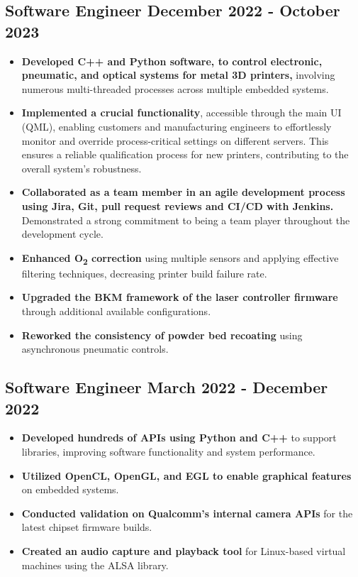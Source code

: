 \documentclass[]{article}
\begin{document}
\subsection{{\large{Software Engineer} \hfill{\small{December 2022 - October 2023}}}}
\vspace{1.5ex}

\begin{itemize}
    \item \textbf{Developed C++ and Python software, to control electronic, pneumatic, and optical systems for metal 3D printers,} involving numerous multi-threaded processes across multiple embedded systems.
    \item \textbf{Implemented a crucial functionality}, accessible through the main UI (QML), enabling customers and manufacturing engineers to effortlessly monitor and override process-critical settings on different servers. 
    This ensures a reliable qualification process for new printers, contributing to the overall system's robustness.
    \item \textbf{Collaborated as a team member in an agile development process using Jira, Git, pull request reviews and CI/CD with Jenkins.} \\ Demonstrated a strong commitment to being a team player throughout the development cycle.
    \item \textbf{Enhanced O\textsubscript{2} correction} using multiple sensors and applying effective filtering techniques, decreasing printer build failure rate.
    \item \textbf{Upgraded the BKM framework of the laser controller firmware} through additional available configurations.
    \item \textbf{Reworked the consistency of powder bed recoating} using asynchronous pneumatic controls.
\end{itemize}

\vspace{2ex}

\subsection{{\large{Software Engineer} \hfill{\small{March 2022 - December 2022}}}}
\vspace{1.5ex}

\begin{itemize}
    \item \textbf{Developed hundreds of APIs using Python and C++} to support libraries, improving software functionality and system performance.
    \item \textbf{Utilized OpenCL, OpenGL, and EGL to enable graphical features} on embedded systems.
    \item \textbf{Conducted validation on Qualcomm's internal camera APIs} for the latest chipset firmware builds. 
    \item \textbf{Created an audio capture and playback tool} for Linux-based virtual machines using the ALSA library.
\end{itemize}
\end{document}
